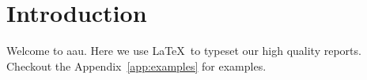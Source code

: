 \chapter{Introduction}\label{cha:Introduction}
Welcome to \gls{aau}. Here we use \LaTeX\ to typeset our high quality reports. Checkout the Appendix~\ref{app:examples} for examples.